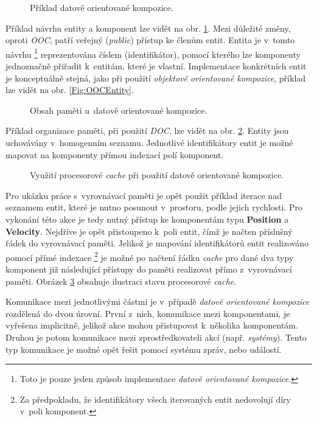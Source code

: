 \begin{figure}[H]
	\caption{Příklad datově orientované kompozice.}
	\label{Fig:DOCHierarchy}
\end{figure}

Příklad návrhu entity a komponent lze vidět na obr. \ref{Fig:DOCHierarchy}. Mezi důležité změny, oproti \emph{OOC}, patří veřejný (\emph{public}) přístup ke členům entit. Entita je v~tomto návrhu \footnote{Toto je pouze jeden způsob implementace \emph{datově orientované kompozice}.} reprezentována číslem (identifikátor), pomocí kterého lze komponenty jednoznačně přiřadit k~entitám, které je vlastní. Implementace konkrétních entit je konceptuálně stejná, jako při použití \emph{objektově orientované kompozice}, příklad lze vidět na obr. \ref{Fig:OOCEntity}.

\begin{figure}[H]
	\caption{Obsah paměti u~datově orientované kompozice.}
	\label{Fig:DOCMemory}
\end{figure}

Příklad organizace paměti, při použití \emph{DOC}, lze vidět na obr. \ref{Fig:DOCMemory}. Entity jsou uchovávány v~homogenním seznamu. Jednotlivé identifikátory entit je možné mapovat na komponenty přímou indexací polí komponent.

\begin{figure}[H]
	\caption{Využití procesorové \emph{cache} při použití datově orientované kompozice.}
	\label{Fig:DOCCache}
\end{figure}

Pro ukázku práce s~vyrovnávací paměti je opět použit příklad iterace nad seznamem entit, které je nutno posunout v~prostoru, podle jejich rychlosti. Pro vykonání této akce je tedy nutný přístup ke komponentám typu \textbf{Position} a \textbf{Velocity}. Nejdříve je opět přistoupeno k~poli entit, čímž je načten příslušný řádek do vyrovnávací paměti. Jelikož je mapování identifikátorů entit realizováno pomocí přímé indexace \footnote{Za předpokladu, že identifikátory všech iterovaných entit nedovolují díry v~poli komponent.} je možné po načtení řádku \emph{cache} pro dané dva typy komponent již následující přístupy do paměti realizovat přímo z~vyrovnávací paměti. Obrázek \ref{Fig:DOCCache} obsahuje ilustraci stavu procesorové \emph{cache}.

Komunikace mezi jednotlivými částmi je v~případě \emph{datově orientované kompozice} rozdělená do dvou úrovní. První z~nich, komunikace mezi komponentami, je vyřešena implicitně, jelikož akce mohou přistupovat k~několika komponentám. Druhou je potom komunikace mezi zprostředkovateli akcí (např. \emph{systémy}). Tento typ komunikace je možné opět řešit pomocí systému zpráv, nebo událostí. 

